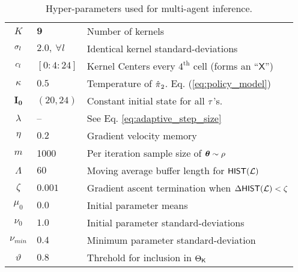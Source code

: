 \begin{table}[htb]
	\centering
	\begin{tabular}{c|l l}
		$K$ & $\mathbf{9}$ & Number of kernels\\
		$\sigma_{l}$ & $2.0,\ \forall l$ & Identical kernel standard-deviations\\
		$c_{l}$ & $[0:4:24]$ & Kernel Centers every $4^\text{th}$ cell (forms an ``$\mathsf{X}$'')\\
		$\kappa$ & $0.5$ & Temperature of $\hat{\pi_{}}_2$. Eq. (\ref{eq:policy_model}) \\
		$\mathbf{I_0}$ & $(20,24)$ & Constant initial state for all $\tau$'s. \\
		$\lambda$ & -- & See Eq. \ref{eq:adaptive_step_size} \\
		$\eta$ & $0.2$ & Gradient velocity memory\\
		$m$ & 1000 & Per iteration sample size of $\boldsymbol{\mathbb{\theta}}\sim \rho$\\
		$\Lambda$ & $60$ & Moving average buffer length for $\mathsf{HIST}(\mathcal{L})$ \\
		$\zeta$ & $0.001$ & Gradient ascent termination when $\Delta\mathsf{HIST}(\mathcal{L}) < \zeta$\\
		$\mu_{0}$ & $0.0$ & Initial parameter means\\
		$\nu_{0}$ & $1.0$ & Initial parameter standard-deviations\\
		$\nu_{min}$ & $0.4$ & Minimum parameter standard-deviation\\
		$\vartheta$ & $\mathbf{0.8}$ & Threhold for inclusion in $\Theta_{\mathsf{K}}$\\
	\end{tabular}
	\caption{Hyper-parameters used for multi-agent inference.}
	\label{table:single_agent_active_hyper_params}
\end{table}

\begin{figure}[htb]
	\begin{center}
	\end{center}
\end{figure}


